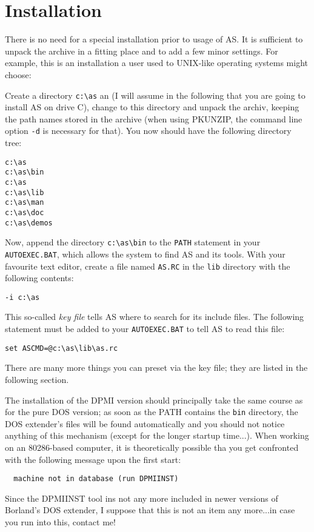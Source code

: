 \documentclass[12pt,twoside]{report}
\newcommand{\tty}[1]{{\tt #1}}
\begin{document}

\section{Installation}

There is no need for a  special installation prior to
usage of AS.  It is sufficient to unpack the archive in a fitting place
and to add a few minor settings.  For example, this is an installation a
user used to UNIX-like operating systems might choose:

Create a directory \verb!c:\as! an (I will assume in the following that
you are going to install AS on drive C), change to this directory and
unpack the archiv, keeping the path names stored in the archive (when
using PKUNZIP, the command line option \verb!-d! is necessary for that).
You now should have the following directory tree:
\begin{verbatim}
c:\as
c:\as\bin
c:\as
c:\as\lib
c:\as\man
c:\as\doc
c:\as\demos
\end{verbatim}
Now, append the directory \verb!c:\as\bin! to the \tty{PATH} statement in
your \tty{AUTOEXEC.BAT}, which allows the system to find AS and its tools.
With your favourite text editor, create a file named \tty{AS.RC} in the
\tty{lib} directory with the following contents:
\begin{verbatim}
-i c:\as
\end{verbatim}
This so-called {\em key file} tells AS where to search for its include
files.  The following statement must be added to your \tty{AUTOEXEC.BAT}
to tell AS to read this file:
\begin{verbatim}
set ASCMD=@c:\as\lib\as.rc
\end{verbatim}
There are many more things you can preset via the key file; they are
listed in the following section.

The installation of the DPMI version  should
principally take the same course as for the pure DOS version; as soon as
the PATH contains the {\tt bin} directory, the DOS extender's files will
be found automatically and you should not notice anything of this
mechanism (except for the longer startup time...).  When working on an
80286-based computer, it is theoretically possible tha you get confronted
with the following message upon the first start:
\begin{verbatim}
  machine not in database (run DPMIINST)
\end{verbatim}
Since the DPMIINST tool ins not any more included in newer versions of
Borland's DOS extender, I suppose that this is not an item any more...in
case you run into this, contact me!
\end{document}
